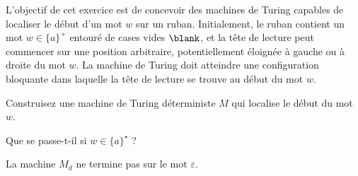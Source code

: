
\begingroup

\begin{exercice}\label{exo:turingmachines/definitions/exploration}

  L'objectif de cet exercice est de concevoir des machines de Turing capables de localiser le début d'un mot $w$ sur un ruban.
  Initialement, le ruban contient un mot $w\in \{a\}^+$ entouré de cases vides $\blank$,
  et la tête de lecture peut commencer sur une position arbitraire, potentiellement éloignée à gauche ou à droite du mot $w$.
  La machine de Turing doit atteindre une configuration bloquante dans laquelle la tête de lecture se trouve au début du mot $w$. 

  \begin{questions}
  \item Construisez une machine de Turing déterministe $M$ qui localise le début du mot $w$.
  \end{questions}
  \begin{corrections}
  \end{corrections}

  \begin{questions}
  \item Que se passe-t-il si $w\in \{a\}^\star$ ?
  \end{questions}
  \begin{corrections}
    La machine $M_{d}$ ne termine pas sur le mot $\varepsilon$. 
  \end{corrections}

\end{exercice}

\endgroup
\endinput
